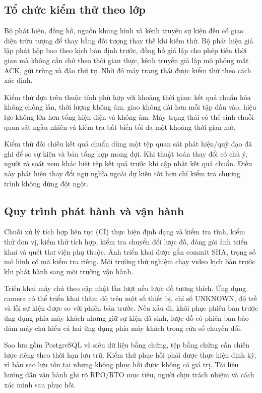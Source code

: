\subsection{Tổ chức kiểm thử theo lớp}
Bộ phát hiện, đồng hồ, nguồn khung hình và kênh truyền sự kiện đều có giao diện trừu tượng để thay bằng đối tượng thay thế khi kiểm thử. Bộ phát hiện giả lập phát hộp bao theo kịch bản định trước, đồng hồ giả lập cho phép tiến thời gian mà không cần chờ theo thời gian thực, kênh truyền giả lập mô phỏng mất ACK, gửi trùng và đảo thứ tự. Nhờ đó máy trạng thái được kiểm thử theo cách xác định.

Kiểm thử dựa trên thuộc tính phù hợp với khoảng thời gian: kết quả chuẩn hóa không chồng lấn, thời lượng không âm, giao không dài hơn mỗi tập đầu vào, hiệu lực không lớn hơn tổng hiện diện và không âm. Máy trạng thái có thể sinh chuỗi quan sát ngẫu nhiên và kiểm tra bất biến tối đa một khoảng thời gian mở.

Kiểm thử đối chiếu kết quả chuẩn dùng một tệp quan sát phát hiện/quỹ đạo đã ghi để so sự kiện và bản tổng hợp mong đợi. Khi thuật toán thay đổi có chủ ý, người rà soát xem khác biệt tệp kết quả trước khi cập nhật kết quả chuẩn. Điều này phát hiện thay đổi ngữ nghĩa ngoài dự kiến tốt hơn chỉ kiểm tra chương trình không dừng đột ngột.

\subsection{Quy trình phát hành và vận hành}
Chuỗi xử lý tích hợp liên tục (CI) thực hiện định dạng và kiểm tra tĩnh, kiểm thử đơn vị, kiểm thử tích hợp, kiểm tra chuyển đổi lược đồ, đóng gói ảnh triển khai và quét thư viện phụ thuộc. Ảnh triển khai được gắn commit SHA, trọng số mô hình có mã kiểm tra riêng. Môi trường thử nghiệm chạy video kịch bản trước khi phát hành sang môi trường vận hành.

Triển khai máy chủ theo cập nhật lần lượt nếu lược đồ tương thích. Ứng dụng camera có thể triển khai thăm dò trên một số thiết bị, chỉ số UNKNOWN, độ trễ và lỗi sự kiện được so với phiên bản trước. Nếu xấu đi, khôi phục phiên bản trước ứng dụng phía máy khách nhưng giữ sự kiện đã sinh, lược đồ có phiên bản bảo đảm máy chủ hiểu cả hai ứng dụng phía máy khách trong cửa sổ chuyển đổi.

Sao lưu gồm PostgreSQL và siêu dữ liệu bằng chứng, tệp bằng chứng cần chiến lược riêng theo thời hạn lưu trữ. Kiểm thử phục hồi phải được thực hiện định kỳ, vì bản sao lưu tồn tại nhưng không phục hồi được không có giá trị. Tài liệu hướng dẫn vận hành ghi rõ RPO/RTO mục tiêu, người chịu trách nhiệm và cách xác minh sau phục hồi.

